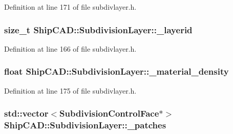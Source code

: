 Definition at line 171 of file subdivlayer.\+h.

\subsubsection[{\texorpdfstring{\+\_\+layerid}{_layerid}}]{\setlength{\rightskip}{0pt plus 5cm}size\+\_\+t Ship\+C\+A\+D\+::\+Subdivision\+Layer\+::\+\_\+layerid\hspace{0.3cm}{\ttfamily [protected]}}\hypertarget{classShipCAD_1_1SubdivisionLayer_a73e4956d179d6ebd6c062e7e76bca196}{}\label{classShipCAD_1_1SubdivisionLayer_a73e4956d179d6ebd6c062e7e76bca196}


Definition at line 166 of file subdivlayer.\+h.

\subsubsection[{\texorpdfstring{\+\_\+material\+\_\+density}{_material_density}}]{\setlength{\rightskip}{0pt plus 5cm}float Ship\+C\+A\+D\+::\+Subdivision\+Layer\+::\+\_\+material\+\_\+density\hspace{0.3cm}{\ttfamily [protected]}}\hypertarget{classShipCAD_1_1SubdivisionLayer_adfdd4e996a5be7147a2eeb682dd93ff8}{}\label{classShipCAD_1_1SubdivisionLayer_adfdd4e996a5be7147a2eeb682dd93ff8}


Definition at line 175 of file subdivlayer.\+h.

\subsubsection[{\texorpdfstring{\+\_\+patches}{_patches}}]{\setlength{\rightskip}{0pt plus 5cm}std\+::vector$<${\bf Subdivision\+Control\+Face}$\ast$$>$ Ship\+C\+A\+D\+::\+Subdivision\+Layer\+::\+\_\+patches\hspace{0.3cm}{\ttfamily [protected]}}\hypertarget{classShipCAD_1_1SubdivisionLayer_a98b25b86a7104e4f987d34506438113f}{}\label{classShipCAD_1_1SubdivisionLayer_a98b25b86a7104e4f987d34506438113f}


